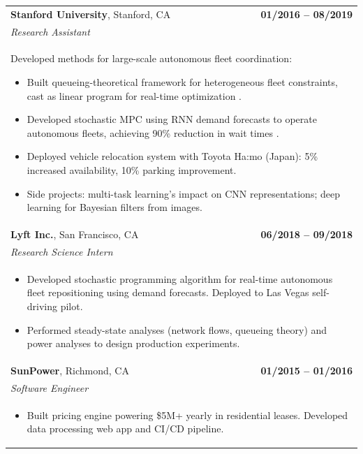 \documentclass[a4paper,10pt]{article}
\begin{document}
\begin{tabularx}{\textwidth}{Xr}
 {\bf{Stanford University}}, Stanford, CA & \bf{01/2016 -- 08/2019}\\
 \emph{Research Assistant} &\\
 \multicolumn{2}{p{0.98\textwidth}}{
 Developed methods for large-scale autonomous fleet coordination:
 \begin{itemize}
 	\item Built queueing-theoretical framework for heterogeneous fleet constraints, cast as linear program for real-time optimization \cite{IglesiasRossiEtAl2016,IglesiasRossiEtAl2017}.
 	\item Developed stochastic MPC using RNN demand forecasts to operate autonomous fleets, achieving 90\% reduction in wait times \cite{IglesiasRossiEtAl2018,TsaoIglesiasEtAl}.
 	\item Deployed vehicle relocation system with Toyota Ha:mo (Japan): 5\% increased availability, 10\% parking improvement.
 	\item Side projects: multi-task learning's impact on CNN representations; deep learning for Bayesian filters from images.
 \end{itemize}
 }\\

 {\bf{Lyft Inc.}}, San Francisco, CA & \bf{06/2018 -- 09/2018}\\
 \emph{Research Science Intern} &\\
 \multicolumn{2}{p{0.98\textwidth}}{
 \begin{itemize}
 	\item Developed stochastic programming algorithm for real-time autonomous fleet repositioning using demand forecasts. Deployed to Las Vegas self-driving pilot.
 	\item Performed steady-state analyses (network flows, queueing theory) and power analyses to design production experiments.
 \end{itemize}
 }\\

{\bf{SunPower}}, Richmond, CA & \bf{01/2015 -- 01/2016}\\
\emph{Software Engineer} &\\
\multicolumn{2}{p{0.98\textwidth}}{
\begin{itemize}
	\item Built pricing engine powering \$5M+ yearly in residential leases. Developed data processing web app and CI/CD pipeline.
\end{itemize}
}\\


\end{tabularx}
\end{document}
